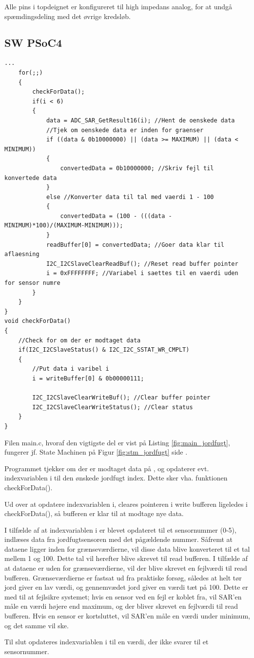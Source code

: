 Alle pins i topdeignet er konfigureret til high impedans analog, for at undgå spæmdingsdeling med det øvrige kredsløb.

\clearpage

\subsection{SW PSoC4}

\begin{lstlisting}[caption=Udsnit af main.c for PSoC4 i Jordfugt, label=fig:main_jordfugt]
...
	for(;;)
    {
        checkForData();
        if(i < 6)
        {
            data = ADC_SAR_GetResult16(i); //Hent de oenskede data
            //Tjek om oenskede data er inden for graenser
            if ((data & 0b10000000) || (data >= MAXIMUM) || (data < MINIMUM)) 
            {
                convertedData = 0b10000000; //Skriv fejl til konvertede data
            }
            else //Konverter data til tal med vaerdi 1 - 100
            {
                convertedData = (100 - (((data - MINIMUM)*100)/(MAXIMUM-MINIMUM))); 
            }
            readBuffer[0] = convertedData; //Goer data klar til aflaesning
            I2C_I2CSlaveClearReadBuf(); //Reset read buffer pointer
            i = 0xFFFFFFFF; //Variabel i saettes til en vaerdi uden for sensor numre
        }
    }
}
void checkForData()
{
    //Check for om der er modtaget data
    if(I2C_I2CSlaveStatus() & I2C_I2C_SSTAT_WR_CMPLT)
    {
        //Put data i varibel i            
        i = writeBuffer[0] & 0b00000111;
        
        I2C_I2CSlaveClearWriteBuf(); //Clear buffer pointer
        I2C_I2CSlaveClearWriteStatus(); //Clear status                               
    }
}
\end{lstlisting}

Filen main.c, hvoraf den vigtigste del er vist på Listing \ref{fig:main_jordfugt}, fungerer jf. State Machinen på Figur \ref{fig:stm_jordfugt} side \pageref{fig:stm_jordfugt}.

Programmet tjekker om der er modtaget data på \IIC, og opdaterer evt. indexvariablen i til den ønskede jordfugt index. Dette sker vha. funktionen checkForData().

Ud over at opdatere indexvariablen i, cleares pointeren i write bufferen ligeledes i checkForData(), så bufferen er klar til at modtage nye data. 

I tilfælde af at indexvariablen i er blevet opdateret til et sensornummer (0-5), indlæses data fra jordfugtsensoren med det pågældende nummer. Såfremt at dataene ligger inden for grænseværdierne, vil disse data blive konverteret til et tal mellem 1 og 100. Dette tal vil herefter blive skrevet til read bufferen.
I tilfælde af at dataene er uden for grænseværdierne, vil der blive skrevet en fejlværdi til read bufferen.
Grænseværdierne er fastsat ud fra praktiske forsøg, således at helt tør jord giver en lav værdi, og gennemvædet jord giver en værdi tæt på 100. 
Dette er med til at fejlsikre systemet; hvis en sensor ved en fejl er koblet fra, vil SAR'en måle en værdi højere end maximum, og der bliver skrevet en fejlværdi til read bufferen. 
Hvis en sensor er kortsluttet, vil SAR'en måle en værdi under minimum, og det samme vil ske. 

Til slut opdateres indexvariablen i til en værdi, der ikke svarer til et sensornummer.

\clearpage